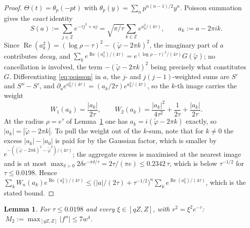 \documentclass[11pt]{article}
\theoremstyle{plain}
\newtheorem{lemma}[theorem]{Lemma}
\theoremstyle{definition}
\theoremstyle{remark}
\newcommand{\Z}{\mathbb{Z}}
\begin{document}
\begin{proof}
$\Theta(t)=\theta_p(-pt)$ with $\theta_p(y)=\sum_np^{n(n-1)/2}y^n$. Poisson summation gives the
\emph{exact} identity
\begin{equation}\label{eq:poisson}
 S(a):=\sum_{j\in\Z}e^{-\tau j^2+aj}=\sqrt{\pi/\tau}\sum_{k\in\Z}e^{a_k^2/(4\tau)},
 \qquad a_k:=a-2\pi ik .
\end{equation}
Since $\operatorname{Re}(a_k^2)=(\log\rho-\tau)^2-(\tilde\varphi-2\pi k)^2$, the imaginary part of $a$ contributes
\emph{decay}, and $\sum_k e^{\operatorname{Re}(a_k^2)/(4\tau)}=e^{(\log\rho-\tau)^2/(4\tau)}G(\tilde\varphi)$; no
cancellation is involved, the term $-(\tilde\varphi-2\pi k)^2$ being precisely what constitutes $G$.
Differentiating \eqref{eq:poisson} in $a$, the $j$- and $j(j-1)$-weighted sums are $S'$ and
$S''-S'$, and $\partial_ae^{a_k^2/(4\tau)}=(a_k/2\tau)e^{a_k^2/(4\tau)}$, so the $k$-th image carries
the weight
\[
 W_1(a_k)=\frac{|a_k|}{2\tau},\qquad
 W_2(a_k)=\frac{|a_k|^2}{4\tau^2}+\frac1{2\tau}+\frac{|a_k|}{2\tau}.
\]
At the radius $\rho=e^\tau$ of Lemma~\ref{app:M2} one has $a_k=i(\tilde\varphi-2\pi k)$ exactly, so
$|a_k|=|\tilde\varphi-2\pi k|$. To pull the weight out of the $k$-sum, note that for $k\ne0$ the
excess $|a_k|-|a_0|$ is paid for by the Gaussian factor, which is smaller by
$e^{-((\tilde\varphi-2\pi k)^2-\tilde\varphi^2)/(4\tau)}$; the aggregate excess is maximised at the
nearest image and is at most $\max_{\delta>0}2\delta e^{-\pi\delta/\tau}=2\tau/(\pi e)\le0.2342\,\tau$,
which is below $\tau^{-1/2}$ for $\tau\le0.0198$. Hence
$\sum_kW_n(a_k)e^{\operatorname{Re}(a_k^2)/(4\tau)}\le\bigl(|a|/(2\tau)+\tau^{-1/2}\bigr)^n
\sum_ke^{\operatorname{Re}(a_k^2)/(4\tau)}$, which is the stated bound.
\end{proof}

\begin{lemma}\label{app:M2}
For $\tau\le0.0198$ and every $\xi\in[qZ,Z]$, with $r^2=\xi^2e^{-\tau}$:
$\ M_2:=\max_{[qZ,Z]}|f''|\le7w^4$.
\end{lemma}
\end{document}
